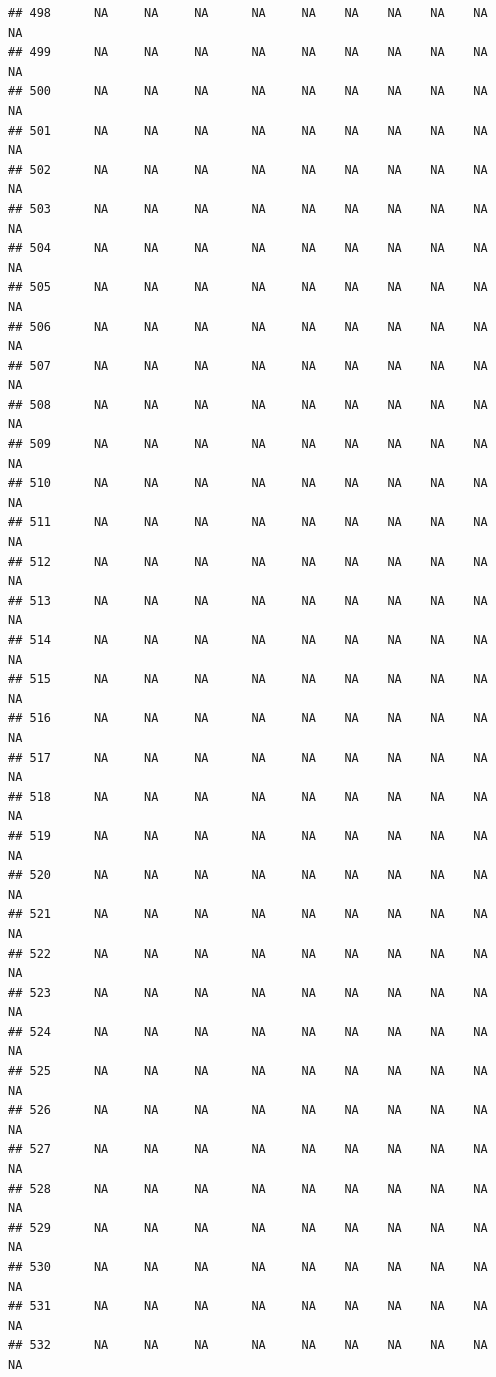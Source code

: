 \documentclass{article}\usepackage{graphicx, color}
\makeatletter
\newenvironment{kframe}{%
 \def\at@end@of@kframe{}%
 \ifinner\ifhmode%
  \def\at@end@of@kframe{\end{minipage}}%
  \begin{minipage}{\columnwidth}%
 \fi\fi%
 \def\FrameCommand##1{\hskip\@totalleftmargin \hskip-\fboxsep
 \colorbox{shadecolor}{##1}\hskip-\fboxsep
     \hskip-\linewidth \hskip-\@totalleftmargin \hskip\columnwidth}%
 \MakeFramed {\advance\hsize-\width
   \@totalleftmargin\z@ \linewidth\hsize
   \@setminipage}}%
 {\par\unskip\endMakeFramed%
 \at@end@of@kframe}
\newenvironment{knitrout}{}{} %
\makeatother
\begin{document}
\begin{knitrout}
\begin{kframe}
\begin{verbatim}
## 498      NA     NA     NA      NA     NA    NA    NA    NA    NA     NA
## 499      NA     NA     NA      NA     NA    NA    NA    NA    NA     NA
## 500      NA     NA     NA      NA     NA    NA    NA    NA    NA     NA
## 501      NA     NA     NA      NA     NA    NA    NA    NA    NA     NA
## 502      NA     NA     NA      NA     NA    NA    NA    NA    NA     NA
## 503      NA     NA     NA      NA     NA    NA    NA    NA    NA     NA
## 504      NA     NA     NA      NA     NA    NA    NA    NA    NA     NA
## 505      NA     NA     NA      NA     NA    NA    NA    NA    NA     NA
## 506      NA     NA     NA      NA     NA    NA    NA    NA    NA     NA
## 507      NA     NA     NA      NA     NA    NA    NA    NA    NA     NA
## 508      NA     NA     NA      NA     NA    NA    NA    NA    NA     NA
## 509      NA     NA     NA      NA     NA    NA    NA    NA    NA     NA
## 510      NA     NA     NA      NA     NA    NA    NA    NA    NA     NA
## 511      NA     NA     NA      NA     NA    NA    NA    NA    NA     NA
## 512      NA     NA     NA      NA     NA    NA    NA    NA    NA     NA
## 513      NA     NA     NA      NA     NA    NA    NA    NA    NA     NA
## 514      NA     NA     NA      NA     NA    NA    NA    NA    NA     NA
## 515      NA     NA     NA      NA     NA    NA    NA    NA    NA     NA
## 516      NA     NA     NA      NA     NA    NA    NA    NA    NA     NA
## 517      NA     NA     NA      NA     NA    NA    NA    NA    NA     NA
## 518      NA     NA     NA      NA     NA    NA    NA    NA    NA     NA
## 519      NA     NA     NA      NA     NA    NA    NA    NA    NA     NA
## 520      NA     NA     NA      NA     NA    NA    NA    NA    NA     NA
## 521      NA     NA     NA      NA     NA    NA    NA    NA    NA     NA
## 522      NA     NA     NA      NA     NA    NA    NA    NA    NA     NA
## 523      NA     NA     NA      NA     NA    NA    NA    NA    NA     NA
## 524      NA     NA     NA      NA     NA    NA    NA    NA    NA     NA
## 525      NA     NA     NA      NA     NA    NA    NA    NA    NA     NA
## 526      NA     NA     NA      NA     NA    NA    NA    NA    NA     NA
## 527      NA     NA     NA      NA     NA    NA    NA    NA    NA     NA
## 528      NA     NA     NA      NA     NA    NA    NA    NA    NA     NA
## 529      NA     NA     NA      NA     NA    NA    NA    NA    NA     NA
## 530      NA     NA     NA      NA     NA    NA    NA    NA    NA     NA
## 531      NA     NA     NA      NA     NA    NA    NA    NA    NA     NA
## 532      NA     NA     NA      NA     NA    NA    NA    NA    NA     NA

\end{verbatim}
\end{kframe}
\end{knitrout}
\end{document}
